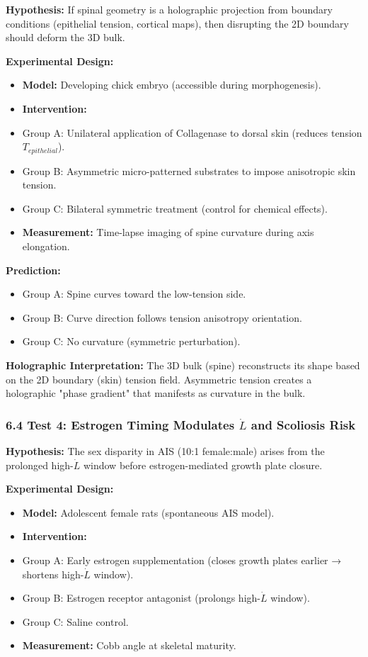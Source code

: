 \documentclass[11pt,a4paper]{article}
\begin{document}
\textbf{Hypothesis:} If spinal geometry is a holographic projection from boundary conditions (epithelial tension, cortical maps), then disrupting the 2D boundary should deform the 3D bulk.

\textbf{Experimental Design:}

\begin{itemize}
\item \textbf{Model:} Developing chick embryo (accessible during morphogenesis).
\item \textbf{Intervention:}
\item Group A: Unilateral application of Collagenase to dorsal skin (reduces tension $T_{epithelial}$).
\item Group B: Asymmetric micro-patterned substrates to impose anisotropic skin tension.
\item Group C: Bilateral symmetric treatment (control for chemical effects).
\item \textbf{Measurement:} Time-lapse imaging of spine curvature during axis elongation.
\end{itemize}

\textbf{Prediction:}

\begin{itemize}
\item Group A: Spine curves toward the low-tension side.
\item Group B: Curve direction follows tension anisotropy orientation.
\item Group C: No curvature (symmetric perturbation).
\end{itemize}

\textbf{Holographic Interpretation:} The 3D bulk (spine) reconstructs its shape based on the 2D boundary (skin) tension field. Asymmetric tension creates a holographic "phase gradient" that manifests as curvature in the bulk.

\subsubsection{6.4 Test 4: Estrogen Timing Modulates $\dot{L}$ and Scoliosis Risk}

\textbf{Hypothesis:} The sex disparity in AIS (10:1 female:male) arises from the prolonged high-$\dot{L}$ window before estrogen-mediated growth plate closure.

\textbf{Experimental Design:}

\begin{itemize}
\item \textbf{Model:} Adolescent female rats (spontaneous AIS model).
\item \textbf{Intervention:}
\item Group A: Early estrogen supplementation (closes growth plates earlier → shortens high-$\dot{L}$ window).
\item Group B: Estrogen receptor antagonist (prolongs high-$\dot{L}$ window).
\item Group C: Saline control.
\item \textbf{Measurement:} Cobb angle at skeletal maturity.
\end{itemize}
\end{document}
